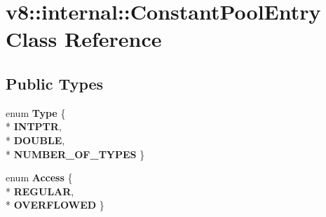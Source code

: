 \hypertarget{classv8_1_1internal_1_1_constant_pool_entry}{}\section{v8\+:\+:internal\+:\+:Constant\+Pool\+Entry Class Reference}
\label{classv8_1_1internal_1_1_constant_pool_entry}
\subsection*{Public Types}
\begin{DoxyCompactItemize}
\item 
enum {\bfseries Type} \{ \\*
{\bfseries I\+N\+T\+P\+TR}, 
\\*
{\bfseries D\+O\+U\+B\+LE}, 
\\*
{\bfseries N\+U\+M\+B\+E\+R\+\_\+\+O\+F\+\_\+\+T\+Y\+P\+ES}
 \}\hypertarget{classv8_1_1internal_1_1_constant_pool_entry_a7544bf628d1729f4c2043ac53cf4eb34}{}\label{classv8_1_1internal_1_1_constant_pool_entry_a7544bf628d1729f4c2043ac53cf4eb34}

\item 
enum {\bfseries Access} \{ \\*
{\bfseries R\+E\+G\+U\+L\+AR}, 
\\*
{\bfseries O\+V\+E\+R\+F\+L\+O\+W\+ED}
 \}\hypertarget{classv8_1_1internal_1_1_constant_pool_entry_a3b552e534b5468e4b9fc4c6dfc67e3c8}{}\label{classv8_1_1internal_1_1_constant_pool_entry_a3b552e534b5468e4b9fc4c6dfc67e3c8}

\end{DoxyCompactItemize}

